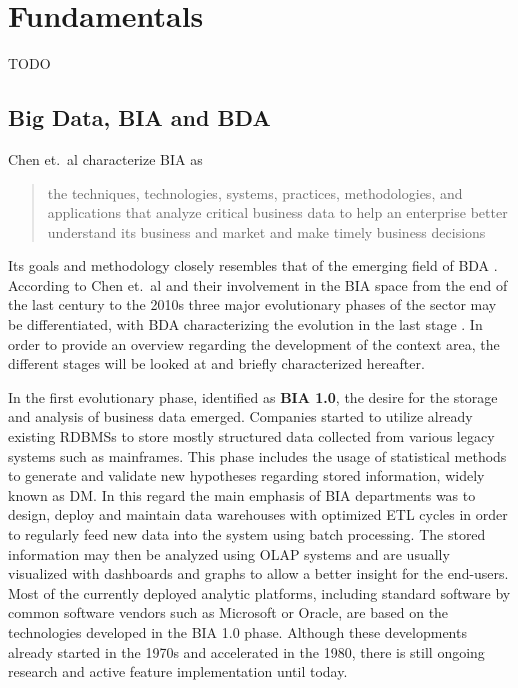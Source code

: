\chapter{Fundamentals}
\label{chap:fund}

TODO

\section{Big Data, \acf{BIA} and \acf{BDA}}

Chen et.~al characterize \ac{BIA} as \blockcquote[p.~1166]{chen2012business}{the techniques, technologies, systems, practices, methodologies, and applications that analyze critical business data to help an enterprise better understand its business and market and make timely business decisions}. Its goals and methodology closely resembles that of the emerging field of \ac{BDA} \autocite[][p.~1166]{chen2012business}. 
According to Chen et.~al and their involvement in the \ac{BIA} space from the end of the last century to the 2010s three major evolutionary phases of the sector may be differentiated, with \ac{BDA} characterizing the evolution in the last stage \autocite[][p.~1168 \psqq]{chen2012business}. In order to provide an overview regarding the development of the context area, the different stages will be looked at and briefly characterized hereafter.

In the first evolutionary phase, identified as \textbf{\ac{BIA} 1.0}, the desire for the storage and analysis of business data emerged. Companies started to utilize already existing \acp{RDBMS} to store mostly structured data collected from various legacy systems such as mainframes. This phase includes the usage of statistical methods to generate and validate new hypotheses regarding stored information, widely known as \ac{DM}. In this regard the main emphasis of \ac{BIA} departments was to design, deploy and maintain data warehouses with optimized \ac{ETL} cycles in order to regularly feed new data into the system using batch processing. The stored information may then be analyzed using \ac{OLAP} systems and are usually visualized with dashboards and graphs to allow a better insight for the end-users.
Most of the currently deployed analytic platforms, including standard software by common software vendors such as Microsoft or Oracle, are based on the technologies developed in the \ac{BIA} 1.0 phase. Although these developments already started in the 1970s and accelerated in the 1980, there is still ongoing research and active feature implementation until today. \autocite[Cmp.][p.~1166 \psq]{chen2012business}

